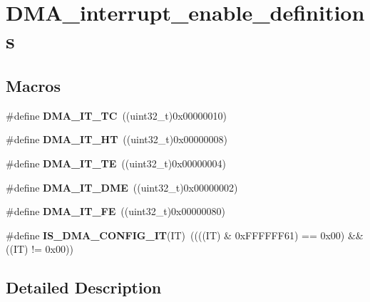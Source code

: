 \hypertarget{group___d_m_a__interrupt__enable__definitions}{\section{D\-M\-A\-\_\-interrupt\-\_\-enable\-\_\-definitions}
\label{group___d_m_a__interrupt__enable__definitions}
}
\subsection*{Macros}
\begin{DoxyCompactItemize}
\item 
\hypertarget{group___d_m_a__interrupt__enable__definitions_ga06e83dd277e0d3e5635cf8ce8dfd6e16}{\#define {\bfseries D\-M\-A\-\_\-\-I\-T\-\_\-\-T\-C}~((uint32\-\_\-t)0x00000010)}\label{group___d_m_a__interrupt__enable__definitions_ga06e83dd277e0d3e5635cf8ce8dfd6e16}

\item 
\hypertarget{group___d_m_a__interrupt__enable__definitions_gadf11c572b9797e04a14b105fdc2e5f66}{\#define {\bfseries D\-M\-A\-\_\-\-I\-T\-\_\-\-H\-T}~((uint32\-\_\-t)0x00000008)}\label{group___d_m_a__interrupt__enable__definitions_gadf11c572b9797e04a14b105fdc2e5f66}

\item 
\hypertarget{group___d_m_a__interrupt__enable__definitions_gaf9d92649d2a0146f663ff253d8f3b59e}{\#define {\bfseries D\-M\-A\-\_\-\-I\-T\-\_\-\-T\-E}~((uint32\-\_\-t)0x00000004)}\label{group___d_m_a__interrupt__enable__definitions_gaf9d92649d2a0146f663ff253d8f3b59e}

\item 
\hypertarget{group___d_m_a__interrupt__enable__definitions_ga71137443f7bdced1ee80697596e9ea98}{\#define {\bfseries D\-M\-A\-\_\-\-I\-T\-\_\-\-D\-M\-E}~((uint32\-\_\-t)0x00000002)}\label{group___d_m_a__interrupt__enable__definitions_ga71137443f7bdced1ee80697596e9ea98}

\item 
\hypertarget{group___d_m_a__interrupt__enable__definitions_ga93164ec039fc5579662c382e68d7d13f}{\#define {\bfseries D\-M\-A\-\_\-\-I\-T\-\_\-\-F\-E}~((uint32\-\_\-t)0x00000080)}\label{group___d_m_a__interrupt__enable__definitions_ga93164ec039fc5579662c382e68d7d13f}

\item 
\hypertarget{group___d_m_a__interrupt__enable__definitions_ga47f6af7da302c19aba24516037d305e7}{\#define {\bfseries I\-S\-\_\-\-D\-M\-A\-\_\-\-C\-O\-N\-F\-I\-G\-\_\-\-I\-T}(I\-T)~((((I\-T) \& 0x\-F\-F\-F\-F\-F\-F61) == 0x00) \&\& ((\-I\-T) != 0x00))}\label{group___d_m_a__interrupt__enable__definitions_ga47f6af7da302c19aba24516037d305e7}

\end{DoxyCompactItemize}


\subsection{Detailed Description}
